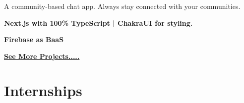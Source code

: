\documentclass[]{deedy-resume-openfont}
\begin{document}
\begin{minipage}[t]{0.67\textwidth}

A community-based chat app. Always stay connected with your communities.\\
\begin{tightemize}
\item \textbf{Next.js with 100\% TypeScript | ChakraUI for styling.}
\item \textbf{Firebase as BaaS}
\end{tightemize}
\sectionsep
\href{https://kishans.in/projects}{\bf{See More Projects.....}}


\section{Internships}


\end{minipage}
\end{document}
